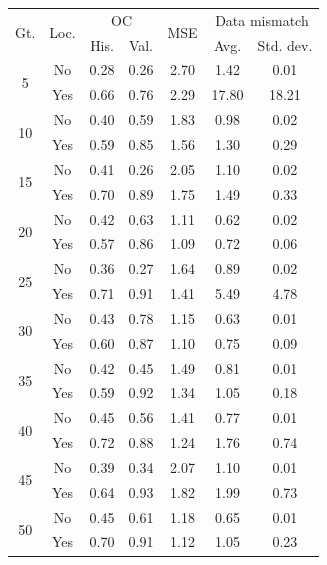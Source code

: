 \begin{tabular}{ccccccc}
\toprule
\multirow{2}{*}{
    Gt.
}
&
\multirow{2}{*}{Loc.} 
& 
\multicolumn{2}{c}{OC} & 
\multirow{2}{*}{
    MSE
} & 
\multicolumn{2}{c}{Data mismatch} 
\\
& & His. & Val. &  & Avg. & Std. dev.
\\
\midrule
\multirow{2}{*}{5} & No & 0.28 & 0.26 & 2.70 & 1.42 & 0.01 \\
 & Yes & 0.66 & 0.76 & 2.29 & 17.80 & 18.21 \\
\midrule
\multirow{2}{*}{10} & No & 0.40 & 0.59 & 1.83 & 0.98 & 0.02 \\
 & Yes & 0.59 & 0.85 & 1.56 & 1.30 & 0.29 \\
\midrule
\multirow{2}{*}{15} & No & 0.41 & 0.26 & 2.05 & 1.10 & 0.02 \\
 & Yes & 0.70 & 0.89 & 1.75 & 1.49 & 0.33 \\
\midrule
\multirow{2}{*}{20} & No & 0.42 & 0.63 & 1.11 & 0.62 & 0.02 \\
 & Yes & 0.57 & 0.86 & 1.09 & 0.72 & 0.06 \\
\midrule
\multirow{2}{*}{25} & No & 0.36 & 0.27 & 1.64 & 0.89 & 0.02 \\
 & Yes & 0.71 & 0.91 & 1.41 & 5.49 & 4.78 \\
\midrule
\multirow{2}{*}{30} & No & 0.43 & 0.78 & 1.15 & 0.63 & 0.01 \\
 & Yes & 0.60 & 0.87 & 1.10 & 0.75 & 0.09 \\
\midrule
\multirow{2}{*}{35} & No & 0.42 & 0.45 & 1.49 & 0.81 & 0.01 \\
 & Yes & 0.59 & 0.92 & 1.34 & 1.05 & 0.18 \\
\midrule
\multirow{2}{*}{40} & No & 0.45 & 0.56 & 1.41 & 0.77 & 0.01 \\
 & Yes & 0.72 & 0.88 & 1.24 & 1.76 & 0.74 \\
\midrule
\multirow{2}{*}{45} & No & 0.39 & 0.34 & 2.07 & 1.10 & 0.01 \\
 & Yes & 0.64 & 0.93 & 1.82 & 1.99 & 0.73 \\
\midrule
\multirow{2}{*}{50} & No & 0.45 & 0.61 & 1.18 & 0.65 & 0.01 \\
 & Yes & 0.70 & 0.91 & 1.12 & 1.05 & 0.23 \\
\bottomrule
\end{tabular}
